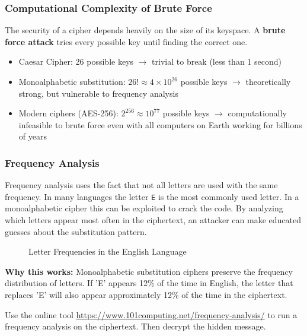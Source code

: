 \documentclass[11pt,a4paper]{report}
\begin{document}
\subsubsection{Computational Complexity of Brute Force}

The security of a cipher depends heavily on the size of its keyspace. A \textbf{brute force attack} tries every possible key until finding the correct one.

\begin{itemize}
    \item Caesar Cipher: 26 possible keys $\rightarrow$ trivial to break (less than 1 second)
    \item Monoalphabetic substitution: $26! \approx 4 \times 10^{26}$ possible keys $\rightarrow$ theoretically strong, but vulnerable to frequency analysis
    \item Modern ciphers (AES-256): $2^{256} \approx 10^{77}$ possible keys $\rightarrow$ computationally infeasible to brute force even with all computers on Earth working for billions of years
\end{itemize}

\subsubsection{Frequency Analysis}

Frequency analysis uses the fact that not all letters are used with the same frequency.
In many languages the letter \verb|E| is the most commonly used letter.
In a monoalphabetic cipher this can be exploited to crack the code. By analyzing which letters appear most often in the ciphertext, an attacker can make educated guesses about the substitution pattern.

\begin{figure}[h]
\caption{Letter Frequencies in the English Language}
\end{figure}

\textbf{Why this works:} Monoalphabetic substitution ciphers preserve the frequency distribution of letters. If 'E' appears 12\% of the time in English, the letter that replaces 'E' will also appear approximately 12\% of the time in the ciphertext.

\begin{ex}
Use the online tool \url{https://www.101computing.net/frequency-analysis/} to run a frequency analysis on the ciphertext.
Then decrypt the hidden message.
\end{ex}
\end{document}
